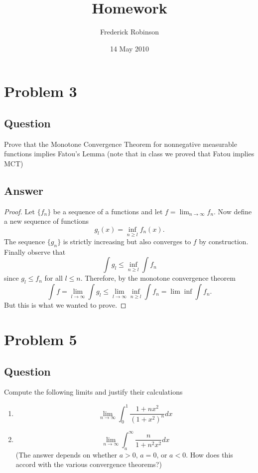 \documentclass[10pt]{article}
\title{Homework}
\author{Frederick Robinson}
\date{14 May 2010}
\begin{document}

   \maketitle

\setcounter{tocdepth}{2} 

\section{Problem 3}
\subsection{Question}
Prove that the Monotone Convergence Theorem for nonnegative measurable functions implies Fatou's Lemma (note that in class we proved that Fatou implies MCT)
\subsection{Answer}
\begin{proof}Let $\{f_n\}$ be a sequence of a functions and let $f =\lim_{ n \to \infty}f_n$. Now define a new sequence of functions 
\[g_l(x) = \inf_{n \geq l} f_{n}(x).\]
 The sequence $\{g_n\}$ is strictly increasing but also converges to $f$ by construction. Finally observe that 
\[\int g_l \leq \inf_{n\geq l } \int f_n\]
since $g_l \leq f_n$ for all $l \leq n$. Therefore, by the monotone convergence theorem
\[\int f = \lim_{l \to \infty} \int  g_l  \leq  \lim_{l \to \infty} \inf_{n \geq l} \int f_n = \lim \inf \int f_n .\]
But this is what we wanted to prove.
\end{proof}

\section{Problem 5}
\subsection{Question}
Compute the following limits and justify their calculations
\begin{enumerate}
\item \[\lim_{n \to \infty} \int_0^1 \frac{1+nx^2}{(1+x^2)^{n}} dx\]
\item \[ \lim_{n \to \infty}  \int_a^\infty \frac{n}{ 1+n^2x^2} dx \]
(The answer depends on whether $a>0$, $a=0$, or $a<0$. How does this accord with the various convergence theorems?)
\end{enumerate}
\end{document}
